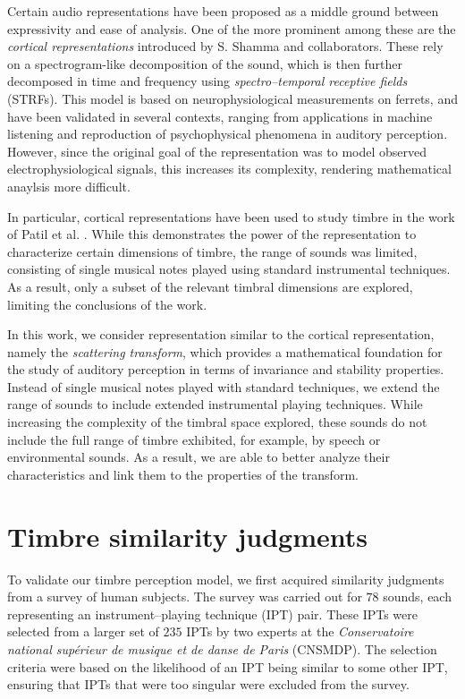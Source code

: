 \documentclass{bmcart}
\begin{document}
Certain audio representations have been proposed as a middle ground between expressivity and ease of analysis.
One of the more prominent among these are the \emph{cortical representations} introduced by S. Shamma and collaborators.
These rely on a spectrogram-like decomposition of the sound, which is then further decomposed in time and frequency using \emph{spectro--temporal receptive fields} (STRFs).
This model is based on neurophysiological measurements on ferrets, and have been validated in several contexts, ranging from applications in machine listening and reproduction of psychophysical phenomena in auditory perception.
However, since the original goal of the representation was to model observed electrophysiological signals, this increases its complexity, rendering mathematical anaylsis more difficult.

In particular, cortical representations have been used to study timbre in the work of Patil et al. \cite{patil2012music}.
While this demonstrates the power of the representation to characterize certain dimensions of timbre, the range of sounds was limited, consisting of single musical notes played using standard instrumental techniques.
As a result, only a subset of the relevant timbral dimensions are explored, limiting the conclusions of the work.

In this work, we consider representation similar to the cortical representation, namely the \emph{scattering transform}, which provides a mathematical foundation for the study of auditory perception in terms of invariance and stability properties.
Instead of single musical notes played with standard techniques, we extend the range of sounds to include extended instrumental playing techniques.
While increasing the complexity of the timbral space explored, these sounds do not include the full range of timbre exhibited, for example, by speech or environmental sounds.
As a result, we are able to better analyze their characteristics and link them to the properties of the transform.

\section*{Timbre similarity judgments}
\label{sec:survey}

To validate our timbre perception model, we first acquired similarity judgments from a survey of human subjects.
The survey was carried out for $78$ sounds, each representing an instrument--playing technique (IPT) pair.
These IPTs were selected from a larger set of $235$ IPTs by two experts at the \emph{Conservatoire national sup\'erieur de musique et de danse de Paris} (CNSMDP).
The selection criteria were based on the likelihood of an IPT being similar to some other IPT, ensuring that IPTs that were too singular were excluded from the survey.
\end{document}
